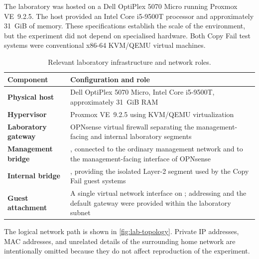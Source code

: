 The laboratory was hosted on a Dell OptiPlex 5070 Micro running Proxmox
VE~9.2.5. The host provided an Intel Core i5-9500T processor and approximately
31~GiB of memory. These specifications establish the scale of the environment,
but the experiment did not depend on specialised hardware. Both Copy Fail test
systems were conventional x86-64 KVM/QEMU virtual machines.

\begin{table}[H]
    \centering
    \caption{Relevant laboratory infrastructure and network roles.}
    \label{tab:lab-infrastructure}
    \small
    \begin{tabularx}{\textwidth}{@{}>{\bfseries}p{}Y@{}}
        \toprule
        Component & Configuration and role \\
        \midrule
        Physical host &
        Dell OptiPlex 5070 Micro, Intel Core i5-9500T, approximately 31~GiB RAM \\

        Hypervisor &
        Proxmox VE~9.2.5 using KVM/QEMU virtualization \\

        Laboratory gateway &
        OPNsense virtual firewall separating the management-facing and internal
        laboratory segments \\

        Management bridge &
        , connected to the ordinary management network and to the
        management-facing interface of OPNsense \\

        Internal bridge &
        , providing the isolated Layer-2 segment used by the Copy
        Fail guest systems \\

        Guest attachment &
        A single virtual network interface on ; addressing and the
        default gateway were provided within the laboratory subnet \\
        \bottomrule
    \end{tabularx}
\end{table}

The logical network path is shown in \cref{fig:lab-topology}. Private IP
addresses, MAC addresses, and unrelated details of the surrounding home
network are intentionally omitted because they do not affect reproduction of
the experiment.

